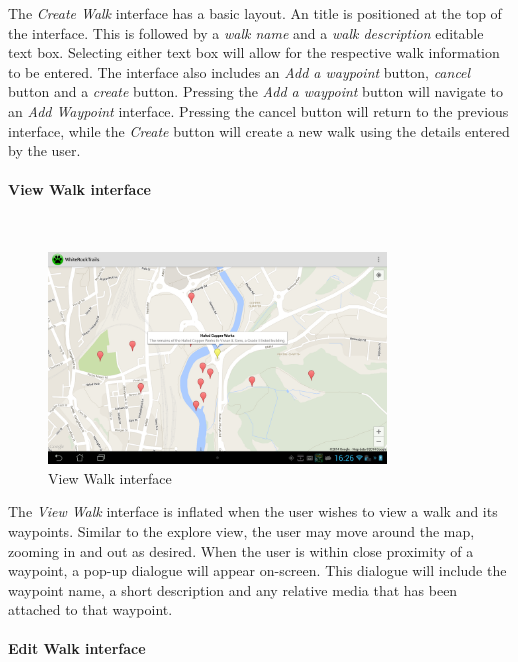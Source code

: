 \documentclass[11pt,a4paper]{report}
\begin{document}
The \emph{Create Walk} interface has a basic layout. An title is positioned at the top of the interface. This is followed by a \emph{walk name} and a \emph{walk description} editable text box. Selecting either text box will allow for the respective walk information to be entered. The interface also includes an \emph{Add a waypoint} button, \emph{cancel} button and a \emph{create} button. Pressing the \emph{Add a waypoint} button will navigate to an \emph{Add Waypoint} interface. Pressing the cancel button will return to the previous interface, while the \emph{Create} button will create a new walk using the details entered by the user.

\paragraph*{View Walk interface}\mbox{}\\

\begin{figure}[H]
    \centering
    \includegraphics[width=0.8\textwidth]{chris/view_walk}
    \caption{View Walk interface}
    \label{fig:view_walk}
\end{figure}

The \emph{View Walk} interface is inflated when the user wishes to view a walk and its waypoints. Similar to the explore view, the user may move around the map, zooming in and out as desired. When the user is within close proximity of a waypoint, a pop-up dialogue will appear on-screen. This dialogue will include the waypoint name, a short description and any relative media that has been attached to that waypoint. 

\paragraph*{Edit Walk interface}\mbox{}\\
\end{document}
